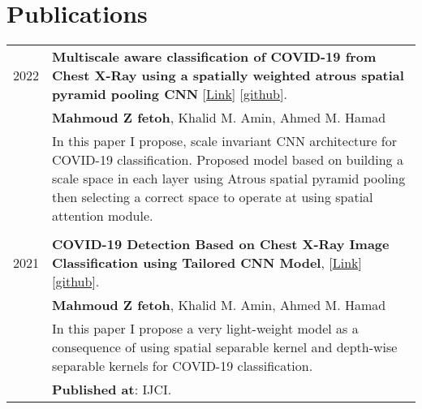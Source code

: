 \documentclass[a4paper,10pt]{article}
\begin{document}
\section{\textbf{Publications}}  
    \begin{longtable}{r p{16cm}}
        2022  & \textbf{Multiscale aware classification of COVID-19 from Chest X-Ray using a spatially weighted atrous spatial pyramid pooling CNN} [\href{https://www.researchsquare.com/article/rs-3043485/v1}{Link}] [\href{https://github.com/zaky-fetoh/Multiscale-aware-classification-of-COVID-19-from-Chest-X-Ray-using-a-spatially-weighted-atrous}{github}].\\& \textbf{Mahmoud Z fetoh}, Khalid M. Amin, Ahmed M. Hamad \\&
        In this paper I propose, scale invariant CNN architecture for COVID-19 classification. Proposed model based on building a scale space in each layer using Atrous spatial pyramid pooling then selecting a correct space to operate at using spatial attention module.\\
        &\\ 
        2021  & \textbf{COVID-19 Detection Based on Chest X-Ray Image Classification using Tailored CNN Model}, [\href{https://scholar.google.com/scholar?cluster=12675761567539204826&hl=en&as_sdt=0,5}{Link}] [\href{https://github.com/zaky-fetoh/PhII-Cov_clf/tree/main}{github}].\\&
        \textbf{Mahmoud Z fetoh}, Khalid M. Amin, Ahmed M. Hamad \\&
        In this paper I propose a very light-weight model as a consequence of using spatial separable kernel and depth-wise separable kernels for COVID-19 classification.\\&
        \textbf{Published at}: IJCI.  
        \\
\end{longtable}


\end{document}
